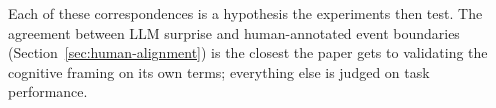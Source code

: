 Each of these correspondences is a hypothesis the experiments then test. The agreement between LLM surprise and human-annotated event boundaries (Section~\ref{sec:human-alignment}) is the closest the paper gets to validating the cognitive framing on its own terms; everything else is judged on task performance.
